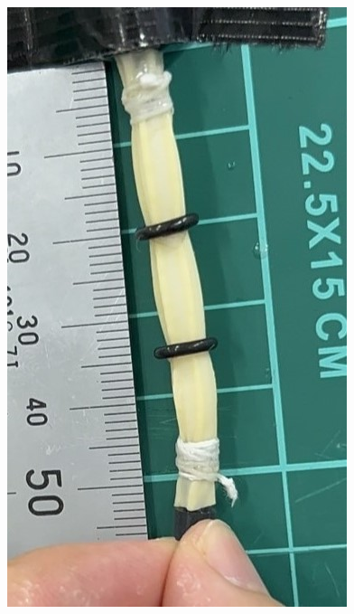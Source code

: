 \begin{figure}[h]
    \begin{minipage}{0.49\columnwidth}
      \vspace{4mm}
      \centering
      \includegraphics[scale=0.3]{pic/M.jpg}
    


\end{minipage}
\end{figure}
